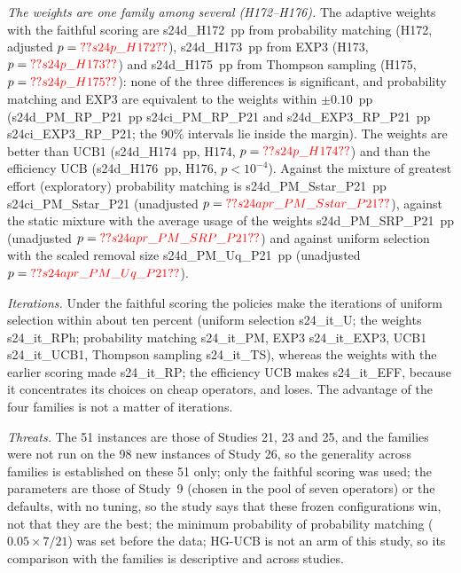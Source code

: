 \emph{The weights are one family among several (H172--H176).} The adaptive weights with the faithful scoring are \num{s24d_H172}~pp from probability matching (H172, adjusted $p=\num{s24p_H172}$), \num{s24d_H173}~pp from EXP3 (H173, $p=\num{s24p_H173}$) and \num{s24d_H175}~pp from Thompson sampling (H175, $p=\num{s24p_H175}$): none of the three differences is significant, and probability matching and EXP3 are equivalent to the weights within $\pm0.10$~pp (\num{s24d_PM_RP_P21}~pp \num{s24ci_PM_RP_P21} and \num{s24d_EXP3_RP_P21}~pp \num{s24ci_EXP3_RP_P21}; the 90\% intervals lie inside the margin). The weights are better than UCB1 (\num{s24d_H174}~pp, H174, $p=\num{s24p_H174}$) and than the efficiency UCB (\num{s24d_H176}~pp, H176, $p<10^{-4}$). Against the mixture of greatest effort (exploratory) probability matching is \num{s24d_PM_Sstar_P21}~pp \num{s24ci_PM_Sstar_P21} (unadjusted $p=\num{s24apr_PM_Sstar_P21}$), against the static mixture with the average usage of the weights \num{s24d_PM_SRP_P21}~pp (unadjusted $p=\num{s24apr_PM_SRP_P21}$) and against uniform selection with the scaled removal size \num{s24d_PM_Uq_P21}~pp (unadjusted $p=\num{s24apr_PM_Uq_P21}$).

\emph{Iterations.} Under the faithful scoring the policies make the iterations of uniform selection within about ten percent (uniform selection \num{s24_it_U}; the weights \num{s24_it_RPh}; probability matching \num{s24_it_PM}, EXP3 \num{s24_it_EXP3}, UCB1 \num{s24_it_UCB1}, Thompson sampling \num{s24_it_TS}), whereas the weights with the earlier scoring made \num{s24_it_RP}; the efficiency UCB makes \num{s24_it_EFF}, because it concentrates its choices on cheap operators, and loses. The advantage of the four families is not a matter of iterations.

\emph{Threats.} The 51 instances are those of Studies 21, 23 and 25, and the families were not run on the 98 new instances of Study 26, so the generality across families is established on these 51 only; only the faithful scoring was used; the parameters are those of Study~9 (chosen in the pool of seven operators) or the defaults, with no tuning, so the study says that these frozen configurations win, not that they are the best; the minimum probability of probability matching ($0.05\times7/21$) was set before the data; HG-UCB is not an arm of this study, so its comparison with the families is descriptive and across studies.




